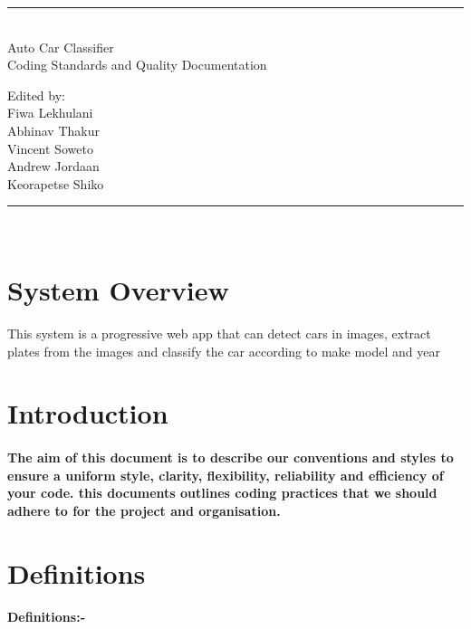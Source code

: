 \documentclass[10pt]{article}
\begin{document}
	
	\begin{titlepage}
		\centering
		\vspace*{\fill}
		
		\vspace*{0.5cm}
		
		\huge\bfseries
		\rule{\textwidth}{1.6pt}\\[\baselineskip]
		Auto Car Classifier \\Coding Standards and Quality Documentation
		
		\vspace*{0.5cm}
		
		\large Edited by: \\[\baselineskip]
		
		{Fiwa Lekhulani\\Abhinav Thakur\\Vincent Soweto\\Andrew Jordaan\\Keorapetse Shiko}
		
		\rule{\textwidth}{1.6pt}\\[\baselineskip]
		
		
		\vspace*{\fill}
	\end{titlepage}
	
	\newpage
	
	\tableofcontents
	
	\newpage
	
	
	\section{System Overview}
	    This system is a progressive web app that can detect cars in images, extract plates from the images and classify the car according to make model and year
	\section{Introduction}
	\paragraph{
	The aim of this document is to describe our conventions and styles to ensure a uniform style, clarity, flexibility, reliability and efficiency of your code. this documents outlines coding practices that we should adhere to for the project and organisation.  }
	
	\section{Definitions}
	\newline
	\textbf{Definitions:-}
	\newline
\end{document}
